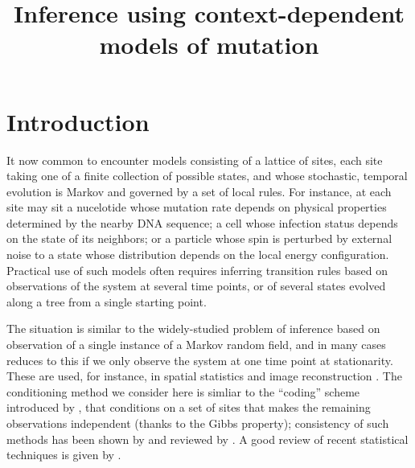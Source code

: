 \documentclass{article}
\theoremstyle{plain}
\theoremstyle{definition}
\begin{document}
%

\title{Inference using context-dependent models of mutation}
\author{}

\maketitle

\begin{abstract}

\end{abstract}

\section*{Introduction}

It now common to encounter models
consisting of a lattice of sites,
each site taking one of a finite collection of possible states,
and whose stochastic, temporal evolution is Markov and governed by a set of local rules.
For instance, at each site may sit
a nucelotide whose mutation rate depends on physical properties determined by the nearby DNA sequence;
a cell whose infection status depends on the state of its neighbors;
or a particle whose spin is perturbed by external noise to a state whose distribution depends on the local energy configuration.
Practical use of such models often requires
inferring transition rules
based on observations of the system at several time points,
or of several states evolved along a tree from a single starting point.

The situation is similar to the widely-studied problem of inference based on observation
of a single instance of a Markov random field,
and in many cases reduces to this if we only observe the system at one time point at stationarity.
These are used, for instance, in spatial statistics \citep{besag1972nearestneighbour,gelfand2010handbook}
and image reconstruction \citep{geman1984stochastic,besag1986statistical}.
The conditioning method we consider here
is simliar to the ``coding'' scheme introduced by \citet{besag1974spatial},
that conditions on a set of sites that makes the remaining observations independent (thanks to the Gibbs property);
consistency of such methods has been shown by \citet{comets1992consistency} and reviewed by \citet{larribe2011composite}.
A good review of recent statistical techniques is given by \citet{friel2012bayesian}.
\end{document}

